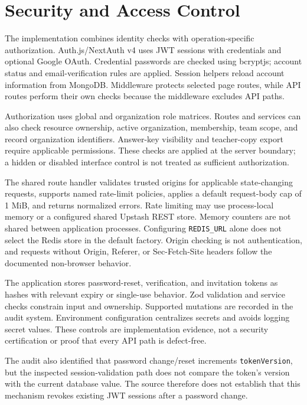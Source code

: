 \section{Security and Access Control}

The implementation combines identity checks with operation-specific authorization. Auth.js/NextAuth v4 uses JWT sessions with credentials and optional Google OAuth. Credential passwords are checked using bcryptjs; account status and email-verification rules are applied. Session helpers reload account information from MongoDB. Middleware protects selected page routes, while API routes perform their own checks because the middleware excludes API paths.

Authorization uses global and organization role matrices. Routes and services can also check resource ownership, active organization, membership, team scope, and record organization identifiers. Answer-key visibility and teacher-copy export require applicable permissions. These checks are applied at the server boundary; a hidden or disabled interface control is not treated as sufficient authorization.

The shared route handler validates trusted origins for applicable state-changing requests, supports named rate-limit policies, applies a default request-body cap of 1 MiB, and returns normalized errors. Rate limiting may use process-local memory or a configured shared Upstash REST store. Memory counters are not shared between application processes. Configuring \texttt{REDIS\_URL} alone does not select the Redis store in the default factory. Origin checking is not authentication, and requests without Origin, Referer, or Sec-Fetch-Site headers follow the documented non-browser behavior.

The application stores password-reset, verification, and invitation tokens as hashes with relevant expiry or single-use behavior. Zod validation and service checks constrain input and ownership. Supported mutations are recorded in the audit system. Environment configuration centralizes secrets and avoids logging secret values. These controls are implementation evidence, not a security certification or proof that every API path is defect-free.

The audit also identified that password change/reset increments \texttt{tokenVersion}, but the inspected session-validation path does not compare the token's version with the current database value. The source therefore does not establish that this mechanism revokes existing JWT sessions after a password change.

